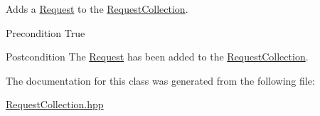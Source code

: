 Adds a \hyperlink{class_request}{Request} to the \hyperlink{class_request_collection}{RequestCollection}. 

\begin{DoxyPrecond}{Precondition}
True 
\end{DoxyPrecond}
\begin{DoxyPostcond}{Postcondition}
The \hyperlink{class_request}{Request} has been added to the \hyperlink{class_request_collection}{RequestCollection}. 
\end{DoxyPostcond}


The documentation for this class was generated from the following file:\begin{DoxyCompactItemize}
\item 
\hyperlink{_request_collection_8hpp}{RequestCollection.hpp}\end{DoxyCompactItemize}
